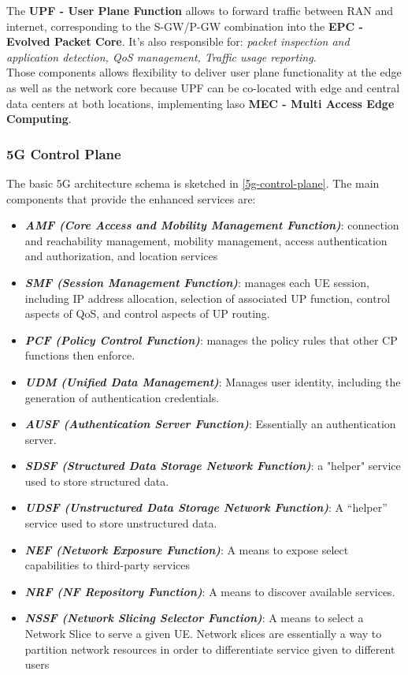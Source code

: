 \documentclass[10pt,a4paper]{report}
\theoremstyle{definition}
\begin{document}
The \textbf{UPF - User Plane Function} allows to forward traffic between RAN and internet, corresponding to the S-GW/P-GW combination into the \textbf{EPC - Evolved Packet Core}. It's also responsible for: \textit{packet inspection and application detection, QoS management, Traffic usage reporting}.\\
Those components allows flexibility to deliver user plane functionality at the edge as well as the network core because UPF can be co-located with edge and central data centers at both locations, implementing laso \textbf{MEC - Multi Access Edge Computing}.

\subsubsection{5G Control Plane}\label{sec:5g-control-plane}
The basic 5G architecture schema is sketched in \ref{5g-control-plane}. The main components that provide the enhanced services are:

\begin{itemize}
	\item 
	\textit{\textbf{AMF (Core Access and Mobility Management Function)}}: connection and reachability management, mobility management, access authentication and authorization, and location services
	\item 
	\textit{\textbf{SMF (Session Management Function)}}: manages each UE session, including IP address allocation, selection of associated UP function, control aspects of QoS, and control aspects of UP routing.  
	\item 
	\textit{\textbf{PCF (Policy Control Function)}}: manages the policy rules that other CP functions then enforce.
	\item 
	\textit{\textbf{UDM (Unified Data Management)}}: Manages user identity, including the generation of authentication credentials.
	\item 
	\textit{\textbf{AUSF (Authentication Server Function)}}: Essentially an authentication server. 
	\item 
	\textit{\textbf{SDSF (Structured Data Storage Network Function)}}: a "helper" service used to store structured data.
	\item 
	\textit{\textbf{UDSF (Unstructured Data Storage Network Function)}}: A “helper” service used to store unstructured data.
	\item 
	\textit{\textbf{NEF (Network Exposure Function)}}: A means to expose select capabilities to third-party services
	\item 
	\textit{\textbf{NRF (NF Repository Function)}}: A means to discover available services.
	\item 
	\textit{\textbf{NSSF (Network Slicing Selector Function)}}: A means to select a Network Slice to serve a given UE. Network slices are essentially a way to partition network resources in order to differentiate service given to different users
\end{itemize}
\end{document}
